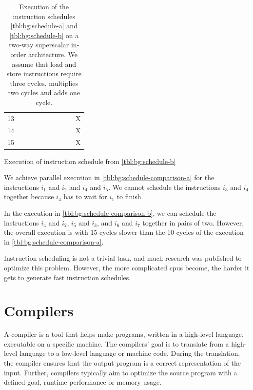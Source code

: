 \begin{table}
\begin{subtable}{0.48\textwidth}
\begin{tabular}{rccccccccc}
            13 &   &   &   &   &   &   &   &   & X \\ \rowcolor[gray]{.975}
            14 &   &   &   &   &   &   &   &   & X \\
            15 &   &   &   &   &   &   &   &   & X \\
            \bottomrule
        \end{tabular}
        \caption{Execution of instruction schedule from \cref{tbl:bg:schedule-b}}
        \label{tbl:bg:schedule-comparison-b}
    \end{subtable}
    \caption[Schedule comparison on a two-way superscalar in-order architecture]{Execution of the instruction schedules \cref{tbl:bg:schedule-a} and \cref{tbl:bg:schedule-b} on a two-way superscalar in-order architecture. 
    We assume that load and store instructions require three cycles, multiplies two cycles and adds one cycle.}
    \label{tbl:bg:schedule-comparison}
\end{table}

We achieve parallel execution in \cref{tbl:bg:schedule-comparison-a} for the instructions $i_1$ and $i_2$ and $i_4$ and $i_5$.
We cannot schedule the instructions $i_3$ and $i_4$ together because $i_4$ has to wait for $i_1$ to finish.

In the execution in \cref{tbl:bg:schedule-comparison-b}, we can schedule the instructions $i_4$ and $i_2$, $i_5$ and $i_3$, and $i_6$ and $i_7$ together in pairs of two.
However, the overall execution is with 15 cycles slower than the 10 cycles of the execution in \cref{tbl:bg:schedule-comparison-a}.

Instruction scheduling is not a trivial task, and much research was published to optimize this problem.
However, the more complicated \acp{cpu} become, the harder it gets to generate fast instruction schedules.

\section{Compilers}
\label{sec:bg:compilers}
A compiler is a tool that helps make programs, written in a high-level language, executable on a specific machine.
The compilers' goal is to translate from a high-level language to a low-level language or machine code.
During the translation, the compiler ensures that the output program is a correct representation of the input.
Further, compilers typically aim to optimize the source program with a defined goal, \eg runtime performance or memory usage.

